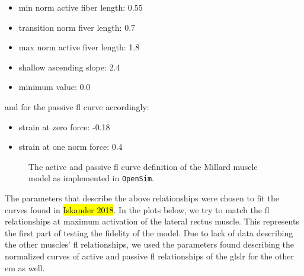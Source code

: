 \documentclass[11pt,a4paper,draft=false]{report}
\begin{document}
\begin{itemize}
\item min norm active fiber length: 0.55
\item transition norm fiver length: 0.7
\item max norm active fiver length: 1.8
\item shallow ascending slope: 2.4
\item minimum value: 0.0
\end{itemize}
%
and for the passive \gls{fl} curve accordingly:

\begin{itemize}
\item strain at zero force: -0.18
\item strain at one norm force: 0.4
\end{itemize}

\begin{figure}[!ht]
  \caption{The active and passive \gls{fl} curve definition of the Millard
    muscle model as implemented in \texttt{OpenSim}.}\label{fig:millard-curves}
\end{figure}

The parameters that describe the above relationships were chosen to fit the
curves found in \hl{Iskander 2018}. In the plots below, we try to match the
\gls{fl} relationships at maximum activation of the lateral rectus muscle. This
represents the first part of testing the fidelity of the model. Due to lack of
data describing the other muscles’ \gls{fl} relationships, we used the
parameters found describing the normalized curves of active and passive \gls{fl}
relationships of the gls{lr} for the other \gls{em} as well.
\end{document}
